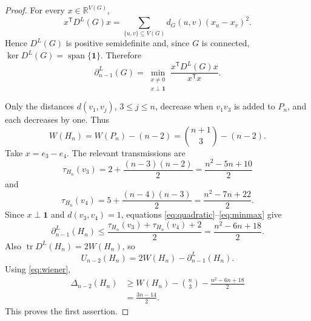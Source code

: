 \documentclass[11pt]{amsart}
\theoremstyle{remark}
\newcommand{\DL}{D^{L}}
\newcommand{\one}{\mathbf 1}
\newcommand{\gap}{\Delta}
\begin{document}
\begin{proof}
For every $x\in\mathbb R^{V(G)}$,
\begin{equation}\label{eq:quadratic}
x^{\mathsf T}\DL(G)x
=\sum_{\{u,v\}\subseteq V(G)}d_G(u,v)(x_u-x_v)^2.
\end{equation}
Hence $\DL(G)$ is positive semidefinite and, since $G$ is connected,
$\ker\DL(G)=\operatorname{span}\{\one\}$.
Therefore
\begin{equation}\label{eq:minmax}
\partial_{n-1}^L(G)
=
\min_{\substack{x\ne0\\x\perp\one}}
\frac{x^{\mathsf T}\DL(G)x}{x^{\mathsf T}x}.
\end{equation}

Only the distances $d(v_1,v_j)$, $3\le j\le n$, decrease when $v_1v_3$ is added to $P_n$, and each decreases by one. Thus
\begin{equation}\label{eq:wiener}
W(H_n)=W(P_n)-(n-2)=\binom{n+1}{3}-(n-2).
\end{equation}
Take $x=e_3-e_4$. The relevant transmissions are
\[
\tau_{H_n}(v_3)=2+\frac{(n-3)(n-2)}2
=\frac{n^2-5n+10}{2}
\]
and
\[
\tau_{H_n}(v_4)=5+\frac{(n-4)(n-3)}2
=\frac{n^2-7n+22}{2}.
\]
Since $x\perp\one$ and $d(v_3,v_4)=1$, equations \eqref{eq:quadratic}--\eqref{eq:minmax} give
\[
\partial_{n-1}^L(H_n)
\le
\frac{\tau_{H_n}(v_3)+\tau_{H_n}(v_4)+2}{2}
=
\frac{n^2-6n+18}{2}.
\]
Also $\operatorname{tr}\DL(H_n)=2W(H_n)$, so
\[
U_{n-2}(H_n)=2W(H_n)-\partial_{n-1}^L(H_n).
\]
Using \eqref{eq:wiener},
\begin{align*}
\gap_{n-2}(H_n)
&\ge
W(H_n)-\binom n3-\frac{n^2-6n+18}{2}\\
&=
\frac{3n-14}{2}.
\end{align*}
This proves the first assertion.


\end{proof}
\end{document}
